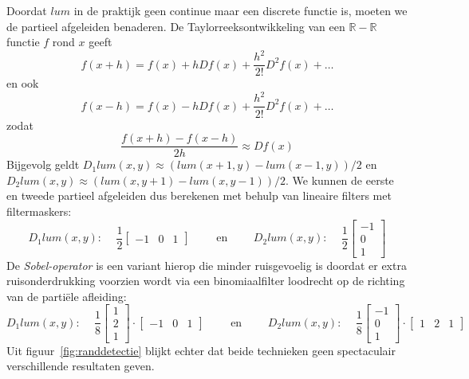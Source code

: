 Doordat $lum$ in de praktijk geen continue maar een discrete functie is, moeten we de partieel afgeleiden benaderen.
De Taylorreeksontwikkeling van een $\mathbb{R} - \mathbb{R}$ functie $f$ rond $x$ geeft
\begin{displaymath}
f(x+h) = f(x) + h D f(x) + \frac{h^2}{2!} D^2 f(x) + \ldots
\end{displaymath}
en ook
\begin{displaymath}
f(x-h) = f(x) - h D f(x) + \frac{h^2}{2!} D^2 f(x) + \ldots
\end{displaymath}
zodat
\begin{displaymath}
\frac{f(x+h) - f(x-h)}{2h} \approx D f(x)
\end{displaymath}
Bijgevolg geldt $D_1 lum(x,y) \approx (lum(x+1,y) - lum(x-1,y))/2$ en $D_2 lum(x,y) \approx (lum(x,y+1) - lum(x,y-1))/2$. We
kunnen de eerste en tweede partieel afgeleiden dus berekenen met behulp van lineaire filters met filtermaskers:
\begin{displaymath}
D_1 lum(x,y)\textrm{: }\quad \frac{1}{2} \left[ \begin{array}{ccc} -1 & 0 & 1 \end{array} \right] \qquad \textrm{ en } 
\qquad D_2 lum(x,y)\textrm{: }\quad \frac{1}{2} \left[ \begin{array}{c} -1 \\ 0 \\ 1 \end{array} \right]
\end{displaymath}
De \emph{Sobel-operator} is een variant hierop die minder ruisgevoelig is doordat er 
extra ruisonderdrukking voorzien wordt via een binomiaalfilter loodrecht op de richting 
van de parti\"ele afleiding:
\begin{displaymath}
D_1 lum(x,y)\textrm{: }\quad \frac{1}{8} \left[ \begin{array}{c} 1 \\ 2 \\ 1 \end{array} \right] \cdot \left[ \begin{array}{ccc} -1 & 0 & 1 \end{array} \right] \qquad \textrm{ en } 
\qquad D_2 lum(x,y)\textrm{: }\quad \frac{1}{8} \left[ \begin{array}{c} -1 \\ 0 \\ 1 \end{array} \right] \cdot \left[ \begin{array}{ccc} 1 & 2 & 1 \end{array} \right]
\end{displaymath}
Uit figuur~\ref{fig:randdetectie} blijkt echter dat beide technieken geen spectaculair verschillende 
resultaten geven.

